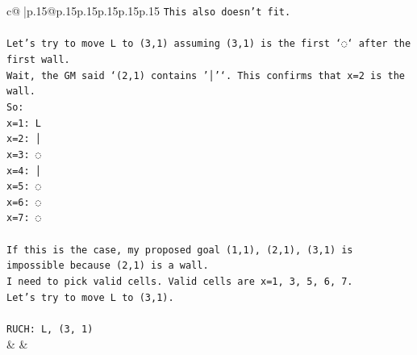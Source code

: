 \documentclass{article}
\begin{document}
{\begin{supertabular}{c@{$\;$}|p{.15\linewidth}@{}p{.15\linewidth}p{.15\linewidth}p{.15\linewidth}p{.15\linewidth}p{.15\linewidth}}
{{{\texttt{This also doesn't fit.} \\
\\ 
\texttt{Let's try to move L to (3,1) assuming (3,1) is the first `◌` after the first wall.} \\
\texttt{Wait, the GM said `(2,1) contains '│'`. This confirms that x=2 is the wall.} \\
\texttt{So:} \\
\texttt{x=1: L} \\
\texttt{x=2: │} \\
\texttt{x=3: ◌} \\
\texttt{x=4: │} \\
\texttt{x=5: ◌} \\
\texttt{x=6: ◌} \\
\texttt{x=7: ◌} \\
\\ 
\texttt{If this is the case, my proposed goal (1,1), (2,1), (3,1) is impossible because (2,1) is a wall.} \\
\texttt{I need to pick valid cells. Valid cells are x=1, 3, 5, 6, 7.} \\
\texttt{Let's try to move L to (3,1).} \\
\\ 
\texttt{RUCH: L, (3, 1)} \\
            }
        }
    }
    & & \\ \\


\end{supertabular}}
\end{document}
